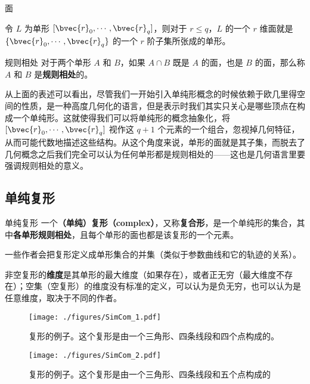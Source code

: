 \begin{definition}{面}

令 $L$ 为单形 $[\bvec{r}_0, \cdots, \bvec{r}_q]$，则对于 $r\leq q$，$L$ 的一个 $r$ 维面就是 $\{\bvec{r}_0, \cdots, \bvec{r}_q\}$ 的一个 $r$ 阶子集所张成的单形。

\end{definition}


\begin{definition}{规则相处}
对于两个单形 $A$ 和 $B$，如果 $A\cap B$ 既是 $A$ 的面，也是 $B$ 的面，那么称 $A$ 和 $B$ 是\textbf{规则相处}的。
\end{definition}


从上面的表述可以看出，尽管我们一开始引入单纯形概念的时候依赖于欧几里得空间的性质，是一种高度几何化的语言，但是表示时我们其实只关心是哪些顶点在构成一个单纯形。这就使得我们可以将单纯形的概念抽象化，将 $[\bvec{r}_0, \cdots, \bvec{r}_q]$ 视作这 $q+1$ 个元素的一个组合，忽视掉几何特征，从而可能代数地描述这些结构。从这个角度来说，单形的面就是其子集，而脱去了几何概念之后我们完全可以认为任何单形都是规则相处的——这也是几何语言里要强调规则相处的意义。

\subsection{单纯复形}

\begin{definition}{单纯复形}
一个\textbf{（单纯）复形（complex）}，又称\textbf{复合形}，是一个单纯形的集合，其中\textbf{各单形规则相处}，且每个单形的面也都是该复形的一个元素。

一些作者会把复形定义成单形集合的并集（类似于参数曲线和它的轨迹的关系）。

非空复形的\textbf{维度}是其单形的最大维度（如果存在），或者正无穷（最大维度不存在）；空集（空复形）的维度没有标准的定义，可以认为是负无穷，也可以认为是任意维度，取决于不同的作者。
\end{definition}

\begin{figure}[ht]
\centering
\texttt{[image: ./figures/SimCom\_1.pdf]}
\caption{复形的例子。这个复形是由一个三角形、四条线段和四个点构成的。} \label{SimCom_fig1}
\end{figure}

\begin{figure}[ht]
\centering
\texttt{[image: ./figures/SimCom\_2.pdf]}
\caption{复形的例子。这个复形是由一个三角形、四条线段和五个点构成的} \label{SimCom_fig2}
\end{figure}


